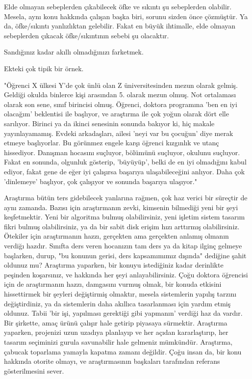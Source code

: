 \documentclass[12pt,fleqn]{article}\usepackage{../../common}
\begin{document}
Elde olmayan sebeplerden çıkabilecek öfke ve sıkıntı şu sebeplerden
olabilir. Mesela, aynı konu hakkında çalışan başka biri, sorunu sizden önce
çözmüştür. Ya da, öfke/sıkıntı yanlızlıktan gelebilir. Fakat en büyük
ihtimalle, elde olmayan sebeplerden çıkacak öfke/sıkıntının sebebi şu
olacaktır.

Sandığınız kadar akıllı olmadığınızı farketmek.

Ekteki çok tipik bir örnek.

"Öğrenci X ülkesi Y'de çok ünlü olan Z üniversitesinden mezun olarak
gelmiş. Geldiği okulda binlerce kişi arasından 5. olarak mezun olmuş. Not
ortalaması olarak son sene, sınıf birincisi olmuş. Öğrenci, doktora
programına 'ben en iyi olacağım' beklentisi ile başlıyor, ve araştırma ile
çok yoğun olarak dört elle sarılıyor. Birinci ya da ikinci senesinin
sonunda bakıyor ki, hiç makale yayınlayamamış. Evdeki arkadaşları, ailesi
'neyi var bu çocuğun' diye merak etmeye başlıyorlar. Bu görünmez engele
karşı öğrenci kızgınlık ve utanç hissediyor. Danışman hocasını suçluyor,
bölümünü suçluyor, okulunu suçluyor. Fakat en sonunda, olgunluk gösterip,
'büyüyüp', belki de en iyi olmadığını kabul ediyor, fakat gene de eğer iyi
çalışırsa başarıya ulaşabileceğini anlıyor. Daha çok 'dinlemeye' başlıyor,
çok çalışıyor ve sonunda başarıya ulaşıyor."

Araştırma bütün ters gidebilecek yanlarına rağmen, çok haz verici bir
süreçtir de aynı zamanda. Bazısı için araştırmanın zevki, kimsenin
bilmediği yeni bir şeyi keşfetmektir. Yeni bir algoritma bulmuş
olabilirsiniz, yeni işletim sistem tasarım fikri bulmuş olabilirsiniz, ya
da bir sabit disk erişim hızı arttırmış olabilirsiniz. Ötekiler için
araştırmanın hazzı, gerçekten ama gerçekten anlamış olmanın verdiğı
hazdır. Sınıfta ders veren hocanızın tam ders ya da kitap ilginç gelmeye
başlarken, durup, "bu konunun gerisi, ders kapsamımımız dışında" dediğine
şahit oldunuz mu? Araştırma yaparken, bir konuyu istediğiniz kadar
derinlikte peşinden koşarsınız, ve hakkında her şeyi anlayabilirsiniz. Çoğu
doktora öğrencisi için de araştırmanın hazzı, damgasını vurmuş olmak, bir
konuda etkisini hissettirmek bir şeyleri değiştirmiş olmaktır, mesela
sistemlerin yapılış tarzını değiştirdiniz, ya da sistemlerin daha akıllıca
tasarlanması için yardım etmiş oldunuz. Tabii 'bir işi, yapılması gerektiği
gibi yapmanın' verdiği haz da vardır. Bir şirkette, amaç ürünü çalışır hale
getirip piyasaya sürmektir. Araştırma yaparken, projenizi uzun uzadıya
planlayıp ve her açıdan kararlaştırıp, her tasarım seçiminizi gurula
savunabilir hale gelmeniz mümkündür. Araştırma, çabucak toparlama yamayla
kapatma zamanı değildir. Çoğu insan da, bir konu hakkında otorite olmayı,
ve araştırmasının başkaları tarafından referans gösterilmesini sever.
\end{document}

